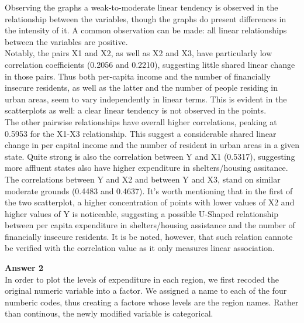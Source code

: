 \documentclass[12pt,letterpaper]{article}
\begin{document}
\vspace{0.5cm}
\noindent Observing the graphs a weak-to-moderate linear tendency is observed in the relationship between the variables, though the graphs do present differences in the intensity of it. A common observation can be made: all linear relationships between the variables are positive. \\
\noindent Notably, the pairs X1 and X2, as well as X2 and X3, have particularly low correlation coefficients (0.2056 and 0.2210), suggesting little shared linear change in those pairs. Thus both per-capita income and the number of financially insecure residents, as well as the latter and the number of people residing in urban areas, seem to vary independently in linear terms. This is evident in the scatterplots as well: a clear linear tendency is not observed in the points. \\
\noindent The other pairwise relationships have overall higher correlations, peaking at 0.5953 for the X1-X3 relationship. This suggest a considerable shared linear change in per capital income and the number of resident in urban areas in a given state. Quite strong is also the correlation between Y and X1 (0.5317), suggesting more affluent states also have higher expenditure in shelters/housing assitance. \\
\noindent The correlations between Y and X2 and between Y and X3, stand on similar moderate grounds (0.4483 and 0.4637). It's worth mentioning that in the first of the two scatterplot, a higher concentration of points with lower values of X2 and higher values of Y is noticeable, suggesting a possible U-Shaped relationship between per capita expenditure in shelters/housing assistance and the number of financially insecure residents. It is be noted, however, that such relation cannote be verified with the correlation value as it only measures linear association. \\
\vspace{1cm}

\noindent\textbf{Answer 2} \\

\noindent In order to plot the levels of expenditure in each region, we first recoded the original numeric variable into a factor. We assigned a name to each of the four numberic codes, thus creating a factore whose levels are the region names. Rather than continous, the newly modified variable is categorical. \\
\end{document}
